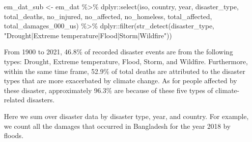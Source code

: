 \documentclass[
  12pt,
]{article}
\newenvironment{Shaded}{}{}
\newcommand{\FunctionTok}[1]{\textcolor[rgb]{0.02,0.16,0.49}{#1}}
\newcommand{\NormalTok}[1]{#1}
\newcommand{\OtherTok}[1]{\textcolor[rgb]{0.00,0.44,0.13}{#1}}
\newcommand{\SpecialCharTok}[1]{\textcolor[rgb]{0.25,0.44,0.63}{#1}}
\newcommand{\StringTok}[1]{\textcolor[rgb]{0.25,0.44,0.63}{#1}}
\begin{document}
\begin{Shaded}
\begin{Highlighting}[]
\NormalTok{em\_dat\_sub }\OtherTok{\textless{}{-}}\NormalTok{ em\_dat }\SpecialCharTok{\%\textgreater{}\%}
\NormalTok{    dplyr}\SpecialCharTok{::}\FunctionTok{select}\NormalTok{(iso, country, year, disaster\_type, }
\NormalTok{        total\_deaths, no\_injured, no\_affected, }
\NormalTok{        no\_homeless, total\_affected, total\_damages\_000\_us) }\SpecialCharTok{\%\textgreater{}\%}
\NormalTok{    dplyr}\SpecialCharTok{::}\FunctionTok{filter}\NormalTok{(}\FunctionTok{str\_detect}\NormalTok{(disaster\_type, }
        \StringTok{"Drought|Extreme temperature|Flood|Storm|Wildfire"}\NormalTok{))}
\end{Highlighting}
\end{Shaded}

From 1900 to 2021, 46.8\% of recorded disaster events are from the
following types: Drought, Extreme temperature, Flood, Storm, and
Wildfire. Furthermore, within the same time frame, 52.9\% of total
deaths are attributed to the disaster types that are more exacerbated by
climate change. As for people affected by these disaster, approximately
96.3\% are because of these five types of climate-related disasters.

Here we sum over disaster data by disaster type, year, and country. For
example, we count all the damages that occurred in Bangladesh for the
year 2018 by floods.
\end{document}
